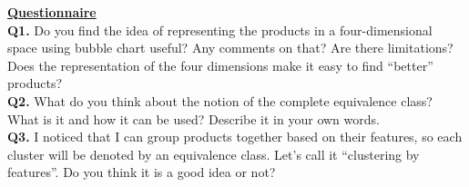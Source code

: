 \documentclass{acm_proc_article-sp}
\begin{document}
\underline{ \textbf{Questionnaire}}\\

\textbf{Q1.} Do you find the idea of representing the products in a four-dimensional space using bubble chart useful? Any comments on that? Are there limitations? Does the representation of the four dimensions make it easy to find “better” products?\\
\textbf{Q2.} What do you think about the notion of the complete equivalence class? What is it and how it can be used? Describe it in your own words.\\
\textbf{Q3.} I noticed that I can group products together based on their features, so each cluster will be denoted by an equivalence class. Let’s call it “clustering by features”. Do you think it is a good idea or not?\\



\balancecolumns
\end{document}
